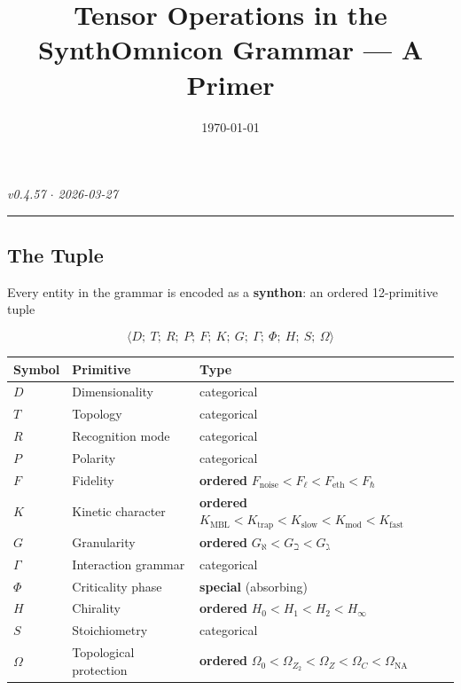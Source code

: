 \documentclass[11pt,a4paper]{article}
\begin{document}
\title{Tensor Operations in the SynthOmnicon Grammar --- A Primer}
\date{\today}

\maketitle

\emph{v0.4.57 $\cdot$ 2026-03-27}

\begin{quote}
\end{quote}

\begin{center}
\rule{0.5\textwidth}{0.4pt}
\end{center}

\subsection{The Tuple}

Every entity in the grammar is encoded as a \textbf{synthon}: an ordered 12-primitive tuple

\[\langle D;\ T;\ R;\ P;\ F;\ K;\ G;\ \Gamma;\ \Phi;\ H;\ S;\ \Omega \rangle\]

\begin{table}[htbp]
\centering
\small
{}
\begin{tabularx}{\textwidth}{>{\centering\arraybackslash}X >{\centering\arraybackslash}X >{\centering\arraybackslash}X}
\toprule
\rowcolor{gray!25}\textbf{Symbol} & \textbf{Primitive} & \textbf{Type} \\
\midrule
\rowcolors{1}{white}{gray!10}
$D$ & Dimensionality & categorical \\
$T$ & Topology & categorical \\
$R$ & Recognition mode & categorical \\
$P$ & Polarity & categorical \\
$F$ & Fidelity & \textbf{ordered} $F_\text{noise} < F_{\ell} < F_\text{eth} < F_{\hbar}$ \\
$K$ & Kinetic character & \textbf{ordered} $K_\text{MBL} < K_\text{trap} < K_\text{slow} < K_\text{mod} < K_\text{fast}$ \\
$G$ & Granularity & \textbf{ordered} $G_{\aleph} < G_{\beth} < G_{\gimel}$ \\
$\Gamma$ & Interaction grammar & categorical \\
$\Phi$ & Criticality phase & \textbf{special} (absorbing) \\
$H$ & Chirality & \textbf{ordered} $H_0 < H_1 < H_2 < H_{\infty}$ \\
$S$ & Stoichiometry & categorical \\
$\Omega$ & Topological protection & \textbf{ordered} $\Omega_0 < \Omega_{Z_2} < \Omega_Z < \Omega_C < \Omega_\text{NA}$ \\
\bottomrule
\end{tabularx}
\end{table}
\end{document}
